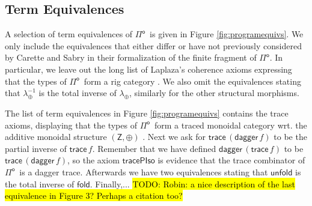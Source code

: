 \documentclass[runningheads,a4paper]{llncs}
\newcommand{\Pio}{\ensuremath{\mathsf{\Pi}^{\mathsf{o}}}}
\newcommand{\lr}{\longleftrightarrow}
\newcommand{\fold}{\mathsf{fold}}
\newcommand{\unfold}{\mathsf{unfold}}
\newcommand{\sub}{\mathsf{sub}}
\newcommand{\trace}{\ensuremath{\mathsf{trace}}}
\newcommand{\Z}{\mathsf{Z}}
\newcommand{\I}{\mathsf{I}}
\renewcommand{\dagger}{\mathsf{dagger}}
\newcommand{\todo}[1]{\hl{TODO: #1}}
\begin{document}

\subsection{Term Equivalences}

A selection of term equivalences of \Pio\ is given in Figure
\ref{fig:programequivs}. We only include the equivalences that either
differ or have not previously considered by Carette and Sabry in their
formalization of the finite fragment of \Pio \cite{CaretteS16}. In
particular, we leave out the long list of Laplaza's coherence axioms
expressing that the types of \Pio\ form a rig category \cite{Laplaza}.
We also omit the equivalences stating that $\lambda_\oplus^{-1}$ is
the total inverse of $\lambda_\oplus$, similarly for the other
structural morphisms. 

The list of term equivalences in Figure \ref{fig:programequivs}
contains the trace axioms, displaying that the types of \Pio\ form a
traced monoidal category wrt. the additive monoidal structure
$(\Z,\oplus)$ \cite{Karvonen19}. Next we ask for
$\trace\,(\dagger\,f)$ to be the partial inverse of
$\trace\,f$. Remember that we have defined $\dagger\,(\trace\,f)$ to
be $\trace\,(\dagger \,f)$, so the axiom $\mathsf{tracePIso}$
is evidence that the trace combinator of \Pio\ is a dagger trace.
Afterwards we have two equivalences stating that $\unfold$ is the
total inverse of $\fold$. Finally,... 
\todo{Robin: a nice description of the last equivalence in Figure 3?
  Perhaps a citation too?}
\end{document}
